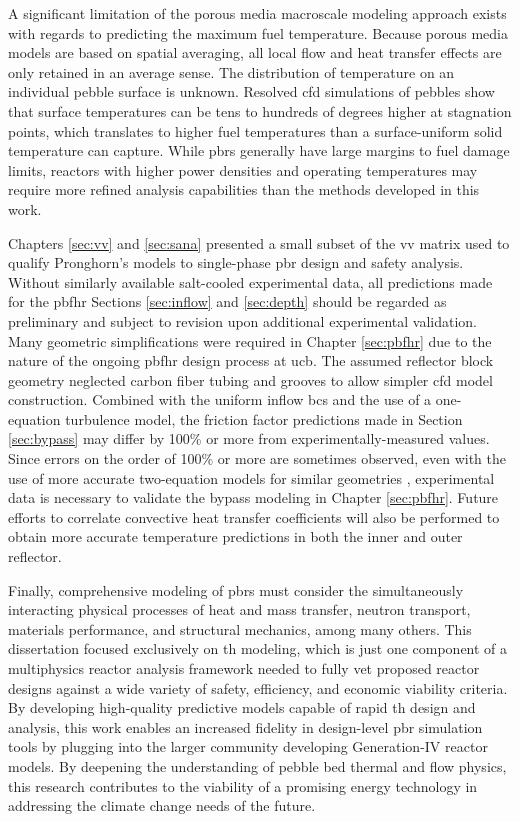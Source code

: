 A significant limitation of the porous media macroscale modeling approach exists with regards to predicting the maximum fuel temperature. Because porous media models are based on spatial averaging, all local flow and heat transfer effects are only retained in an average sense. The distribution of temperature on an individual pebble surface is unknown. Resolved \gls{cfd} simulations of pebbles show that surface temperatures can be tens to hundreds of degrees higher at stagnation points, which translates to higher fuel temperatures than a surface-uniform solid temperature can capture. While \glspl{pbr} generally have large margins to fuel damage limits, reactors with higher power densities and operating temperatures may require more refined analysis capabilities than the methods developed in this work. 

Chapters \ref{sec:vv} and \ref{sec:sana} presented a small subset of the \gls{vv} matrix used to qualify Pronghorn's models to single-phase \gls{pbr} design and safety analysis. Without similarly available salt-cooled experimental data, all predictions made for the \gls{pbfhr} Sections \ref{sec:inflow} and \ref{sec:depth} should be regarded as preliminary and subject to revision upon additional experimental validation. Many geometric simplifications were required in Chapter \ref{sec:pbfhr} due to the nature of the ongoing \gls{pbfhr} design process at \gls{ucb}. The assumed reflector block geometry neglected carbon fiber tubing and grooves to allow simpler \gls{cfd} model construction. Combined with the uniform inflow \glspl{bc} and the use of a one-equation turbulence model, the friction factor predictions made in Section \ref{sec:bypass} may differ by 100\% or more from experimentally-measured values. Since errors on the order of 100\% or more are sometimes observed, even with the use of more accurate two-equation models for similar geometries \cite{wyk}, experimental data is necessary to validate the bypass modeling in Chapter \ref{sec:pbfhr}. Future efforts to correlate convective heat transfer coefficients will also be performed to obtain more accurate temperature predictions in both the inner and outer reflector.

Finally, comprehensive modeling of \glspl{pbr} must consider the simultaneously interacting physical processes of heat and mass transfer, neutron transport, materials performance, and structural mechanics, among many others. This dissertation focused exclusively on \gls{th} modeling, which is just one component of a multiphysics reactor analysis framework needed to fully vet proposed reactor designs against a wide variety of safety, efficiency, and economic viability criteria. By developing high-quality predictive models capable of rapid \gls{th} design and analysis, this work enables an increased fidelity in design-level \gls{pbr} simulation tools by plugging into the larger community developing Generation-IV reactor models. By deepening the understanding of pebble bed thermal and flow physics, this research contributes to the viability of a promising energy technology in addressing the climate change needs of the future.
